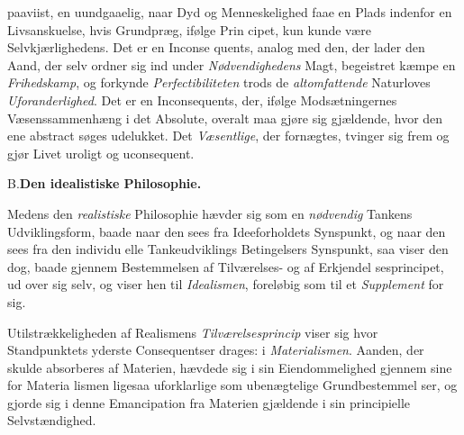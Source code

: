 paaviist, en uundgaaelig, naar Dyd og Menneskelighed faae en
Plads indenfor en Livsanskuelse, hvis Grundpræg, ifølge Prin\-%
cipet, kun kunde være Selvkjærlighedens. Det er en Inconse\-%
quents, analog med den, der lader den Aand, der selv ordner
sig ind under \emph{Nødvendighedens} Magt, begeistret kæmpe
en \emph{Frihedskamp}, og forkynde \emph{Perfectibiliteten} trods de
\emph{altomfattende} Naturloves \emph{Uforanderlighed}. Det er en
Inconsequents, der, ifølge Modsætningernes Væsenssammenhæng
i det Absolute, overalt maa gjøre sig gjældende, hvor den ene
abstract søges udelukket. Det \emph{Væsentlige}, der fornægtes,
tvinger sig frem og gjør Livet uroligt og uconsequent.

\divrule

\begin{center}
B.\enspace\textbf{Den idealistiske Philosophie.}
\end{center}

Medens den \emph{realistiske} Philosophie hævder sig som en
\emph{nødvendig} Tankens Udviklingsform, baade naar den sees fra
Ideeforholdets Synspunkt, og naar den sees fra den individu\-%
elle Tankeudviklings Betingelsers Synspunkt, saa viser den dog,
baade gjennem Bestemmelsen af Tilværelses- og af Erkjendel\-%
sesprincipet, ud over sig selv, og viser hen til \emph{Idealismen},
foreløbig som til et \emph{Supplement} for sig.

Utilstrækkeligheden af Realismens \emph{Tilværelsesprincip}
viser sig hvor Standpunktets yderste Consequentser drages: i
\emph{Materialismen}. Aanden, der skulde absorberes af Materien,
hævdede sig i sin Eiendommelighed gjennem sine for Materia\-%
lismen ligesaa uforklarlige som ubenægtelige Grundbestemmel\-%
ser, og gjorde sig i denne Emancipation fra Materien gjældende
i sin principielle Selvstændighed.

